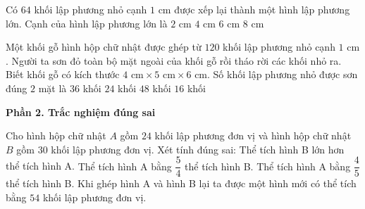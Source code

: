 \begin{ex} %
Có $64$ khối lập phương nhỏ cạnh $1\text{ cm}$ được xếp lại thành một hình lập phương lớn. Cạnh của hình lập phương lớn là
\choice
{$2\text{ cm}$}
{\True $4\text{ cm}$}
{$6\text{ cm}$}
{$8\text{ cm}$}
\end{ex}

\begin{ex} %
Một khối gỗ hình hộp chữ nhật được ghép từ $120$ khối lập phương nhỏ cạnh $1\text{ cm}$. Người ta sơn đỏ toàn bộ mặt ngoài của khối gỗ rồi tháo rời các khối nhỏ ra. Biết khối gỗ có kích thước $4\text{ cm} \times 5\text{ cm} \times 6\text{ cm}$. Số khối lập phương nhỏ được sơn đúng $2$ mặt là
\choice
{\True $36$ khối}
{$24$ khối}
{$48$ khối}
{$16$ khối}
\end{ex}

\textbf{Phần 2. Trắc nghiệm đúng sai}

\begin{ex} %
Cho hình hộp chữ nhật $A$ gồm $24$ khối lập phương đơn vị và hình hộp chữ nhật $B$ gồm $30$ khối lập phương đơn vị. Xét tính đúng sai:
\choiceTF
{\True Thể tích hình B lớn hơn thể tích hình A.}
{Thể tích hình A bằng $\dfrac{5}{4}$ thể tích hình B.}
{\True Thể tích hình A bằng $\dfrac{4}{5}$ thể tích hình B.}
{\True Khi ghép hình A và hình B lại ta được một hình mới có thể tích bằng $54$ khối lập phương đơn vị.}
\end{ex}

